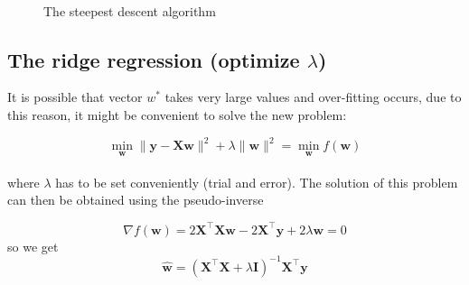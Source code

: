 \documentclass[a4paper,12pt,oneside,titlepage]{article}
\begin{document}
\begin{figure}[H]
\begin{center}
			\\
			\caption{The steepest descent algorithm}
			\label{fig:sda}
		\end{center}
	\end{figure}
	
	\newpage
	\subsection{The ridge regression (optimize $\lambda$)}
	It is possible that vector $w^*$ takes very large values and over-fitting occurs, due to this reason, it might be convenient to solve the new problem:
	
	\begin{equation}
	\operatorname { min } _ { \mathbf { w } } \| \mathbf { y } - \mathbf { X } \mathbf { w } \| ^ { 2 } + \lambda \| \mathbf { w } \| ^ { 2 } = \operatorname { min } _ { \mathbf { w } } f ( \mathbf { w } )
	\end{equation}\\
	where $\lambda$ has to be set conveniently (trial and error). The solution of this problem can then be obtained using the pseudo-inverse
	
	\begin{equation}
	\nabla f ( \mathbf { w } ) = 2 \mathbf { X } ^ { \top } \mathbf { X } \mathbf { w } - 2 \mathbf { X } ^ { \top } \mathbf { y } + 2 \lambda \mathbf { w } = 0
	\end{equation}
	so we get	
	\begin{equation}
	\hat { \mathbf { w } } = \left( \mathbf { X } ^ { \top } \mathbf { X } + \lambda \mathbf { I } \right) ^ { - 1 } \mathbf { X } ^ { \top } \mathbf { y }
	\end{equation}
	
\end{document}
